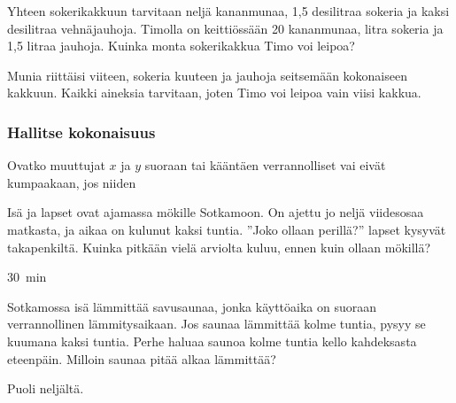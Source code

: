 \begin{tehtavasivu}
\begin{tehtava}
Yhteen sokerikakkuun tarvitaan neljä kananmunaa, 1,5 desilitraa sokeria ja kaksi desilitraa vehnäjauhoja. Timolla on keittiössään 20 kananmunaa, litra sokeria ja 1,5 litraa jauhoja. Kuinka monta sokerikakkua Timo voi leipoa?  
\begin{vastaus}
Munia riittäisi viiteen, sokeria kuuteen ja jauhoja seitsemään kokonaiseen kakkuun. Kaikki aineksia tarvitaan, joten Timo voi leipoa vain viisi kakkua.
\end{vastaus}
\end{tehtava}

\subsubsection*{Hallitse kokonaisuus}

\begin{tehtava}
Ovatko muuttujat $ x $ ja $ y $ suoraan tai kääntäen verrannolliset vai eivät kumpaakaan, jos niiden
\begin{alakohdat}
\end{alakohdat}
\begin{vastaus}
\begin{alakohdat}
\end{alakohdat}
\end{vastaus}
\end{tehtava}

\begin{tehtava}
Isä ja lapset ovat ajamassa mökille Sotkamoon. On ajettu jo neljä viidesosaa matkasta, ja aikaa on kulunut kaksi tuntia. ''Joko ollaan perillä?'' lapset kysyvät takapenkiltä. Kuinka pitkään vielä arviolta kuluu, ennen kuin ollaan mökillä?
    \begin{vastaus}
        $30$~min
    \end{vastaus}
\end{tehtava}

\begin{tehtava}
Sotkamossa isä lämmittää savusaunaa, jonka käyttöaika on suoraan verrannollinen lämmitysaikaan. Jos saunaa lämmittää kolme tuntia, pysyy se kuumana kaksi tuntia. Perhe haluaa saunoa kolme tuntia kello kahdeksasta eteenpäin. Milloin saunaa pitää alkaa lämmittää?
\begin{vastaus}
Puoli neljältä.
\end{vastaus}
\end{tehtava}


\end{tehtavasivu}
